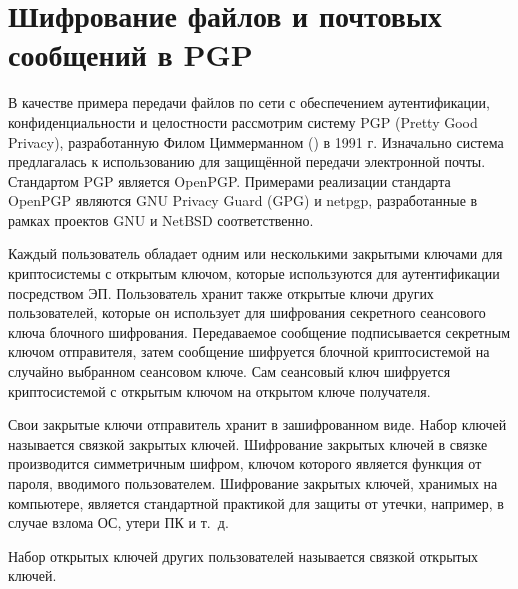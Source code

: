 \section{Шифрование файлов и почтовых сообщений в PGP}

В качестве примера передачи файлов по сети с обеспечением аутентификации, конфиденциальности и целостности рассмотрим систему PGP (Pretty Good Privacy), разработанную Филом Циммерманном () в 1991 г. Изначально система предлагалась к использованию для защищённой передачи электронной почты. Стандартом PGP является OpenPGP. Примерами реализации стандарта OpenPGP являются GNU Privacy Guard (GPG) и netpgp, разработанные в рамках проектов GNU и NetBSD соответственно.

Каждый пользователь обладает одним или несколькими закрытыми ключами для криптосистемы с открытым ключом, которые используются для аутентификации посредством ЭП. Пользователь хранит также открытые ключи других пользователей, которые он использует для шифрования секретного сеансового ключа блочного шифрования. Передаваемое сообщение подписывается секретным ключом отправителя, затем сообщение шифруется блочной криптосистемой на случайно выбранном сеансовом ключе. Сам сеансовый ключ шифруется криптосистемой с открытым ключом на открытом ключе получателя.

Свои закрытые ключи отправитель хранит в зашифрованном виде. Набор ключей называется связкой закрытых ключей. Шифрование закрытых ключей в связке производится симметричным шифром, ключом которого является функция от пароля, вводимого пользователем. Шифрование закрытых ключей, хранимых на компьютере, является стандартной практикой для защиты от утечки, например, в случае взлома ОС, утери ПК и т.~д.

Набор открытых ключей других пользователей называется связкой открытых ключей.

